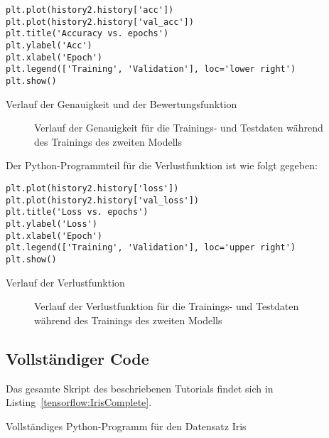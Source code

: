 \begin{code}
    \begin{lstlisting}[numbers=none]
plt.plot(history2.history['acc'])
plt.plot(history2.history['val_acc'])
plt.title('Accuracy vs. epochs')
plt.ylabel('Acc')
plt.xlabel('Epoch')
plt.legend(['Training', 'Validation'], loc='lower right')
plt.show()
\end{lstlisting}

\caption{Verlauf der Genauigkeit und der Bewertungsfunktion}
\end{code}


\begin{figure}[H]
	\caption{Verlauf der Genauigkeit für die Trainings- und Testdaten während des Trainings des zweiten Modells}
	\label{TensorFlowIrisPlotHist3}
\end{figure}


Der Python-Programmteil für die Verlustfunktion ist wie folgt gegeben:

\begin{code}
    \begin{lstlisting}[numbers=none]
plt.plot(history2.history['loss'])
plt.plot(history2.history['val_loss'])
plt.title('Loss vs. epochs')
plt.ylabel('Loss')
plt.xlabel('Epoch')
plt.legend(['Training', 'Validation'], loc='upper right')
plt.show()
\end{lstlisting}

\caption{Verlauf der Verlustfunktion}
\end{code}

\begin{figure}[H]
	\caption{Verlauf der Verlustfunktion für die Trainings- und Testdaten während des Trainings des zweiten Modells}
	\label{TensorFlowIrisPlotHist4}
\end{figure}


\subsection{Vollständiger Code}

Das gesamte Skript des beschriebenen Tutorials findet sich in Listing~\ref{tensorflow:IrisComplete}.

\begin{code}


\caption{Vollständiges Python-Programm für den Datensatz Iris}\label{tensorflow:IrisComplete}
\end{code}


